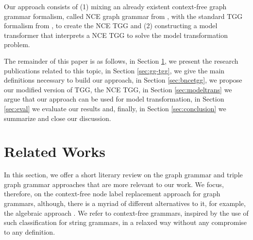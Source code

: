 \documentclass[runningheads]{llncs}
\begin{document}
Our approach consists of (1) mixing an already existent context-free graph grammar formalism, called NCE graph grammar from \cite{janssens1982graph}, with the standard TGG formalism from \cite{schurr1994specification}, to create the NCE TGG and (2) constructing a model transformer that interprets a NCE TGG to solve the model transformation problem.

The remainder of this paper is as follows, in Section \ref{sec:rw}, we present the research publications related to this topic, in Section \ref{sec:gg-tgg}, we give the main definitions necessary to build our approach, in Section \ref{sec:bncetgg}, we propose our modified version of TGG, the NCE TGG, in Section \ref{sec:modeltrans} we argue that our approach can be used for model transformation, in Section \ref{sec:eval} we evaluate our results and, finally, in Section \ref{sec:conclusion} we summarize and close our discussion.

\section{Related Works}
\label{sec:rw}
In this section, we offer a short literary review on the graph grammar and triple graph grammar approaches that are more relevant to our work. We focus, therefore, on the context-free node label replacement approach for graph grammars, although, there is a myriad of different alternatives to it, for example, the algebraic approach \cite{ehrig1999handbook}. We refer to context-free grammars, inspired by the use of such classification for string grammars, in a relaxed way without any compromise to any definition.

\end{document}
